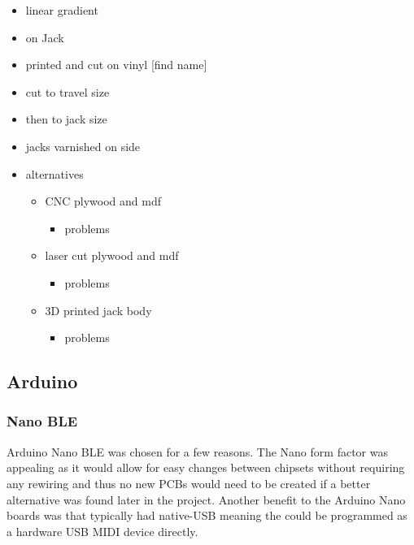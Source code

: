 \begin{itemize}
\item
  linear gradient
\item
  on Jack
\item
  printed and cut on vinyl {[}find name{]}
\item
  cut to travel size
\item
  then to jack size
\item
  jacks varnished on side
\item
  alternatives

  \begin{itemize}
  \item
    CNC plywood and mdf

    \begin{itemize}
    \item
      problems
    \end{itemize}
  \item
    laser cut plywood and mdf

    \begin{itemize}
    \item
      problems
    \end{itemize}
  \item
    3D printed jack body

    \begin{itemize}
    \item
      problems
    \end{itemize}
  \end{itemize}
\end{itemize}

\subsection{Arduino}\label{arduino}

\subsubsection{Nano BLE}\label{nano-ble}

Arduino Nano BLE was chosen for a few reasons. The Nano form factor was
appealing as it would allow for easy changes between chipsets without
requiring any rewiring and thus no new PCBs would need to be created if
a better alternative was found later in the project. Another benefit to
the Arduino Nano boards was that typically had native-USB meaning the
could be programmed as a hardware USB MIDI device directly.

